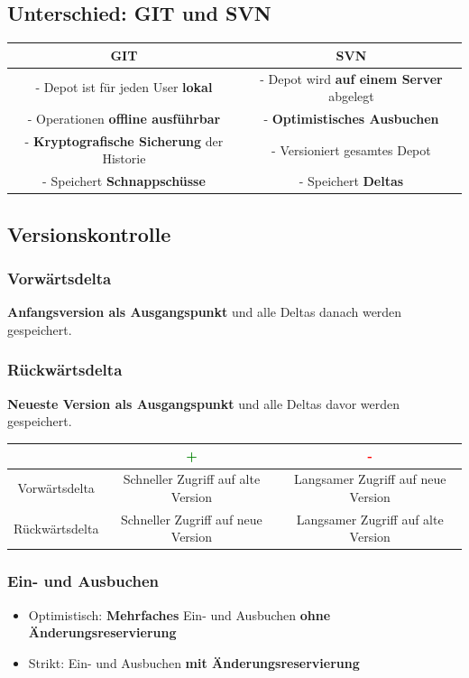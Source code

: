 	\subsection{Unterschied: GIT und SVN}
		
		\begin{center}
			\begin{tabular}{c|c}
				\textbf{GIT}                                      & \textbf{SVN} \\
				\hline
				- Depot ist für jeden User \textbf{lokal}         & - Depot wird \textbf{auf einem Server} abgelegt \\
				- Operationen \textbf{offline ausführbar}         & - \textbf{Optimistisches Ausbuchen} \\
				- \textbf{Kryptografische Sicherung} der Historie & - Versioniert gesamtes Depot \\
				- Speichert \textbf{Schnappschüsse}               & - Speichert \textbf{Deltas} \\
			\end{tabular}
		\end{center}
		
	\subsection{Versionskontrolle}
		
		\subsubsection{Vorwärtsdelta}
		
			\textbf{Anfangsversion als Ausgangspunkt} und alle Deltas danach werden gespeichert.
			
		\subsubsection{Rückwärtsdelta}
			
			\textbf{Neueste Version als Ausgangspunkt} und alle Deltas davor werden gespeichert.
				
			\begin{tabular}{c|c|c}
				               & \textcolor{green}{\textbf{+}}      & \textcolor{red}{\textbf{-}} \\
				\hline
				Vorwärtsdelta  & Schneller Zugriff auf alte Version & Langsamer Zugriff auf neue Version \\
				\hline
				Rückwärtsdelta & Schneller Zugriff auf neue Version & Langsamer Zugriff auf alte Version \\
			\end{tabular}
			
		\subsubsection{Ein- und Ausbuchen}
		
			\begin{itemize}
				\item Optimistisch: \textbf{Mehrfaches} Ein- und Ausbuchen \textbf{ohne Änderungsreservierung}
				\item Strikt: Ein- und Ausbuchen \textbf{mit Änderungsreservierung}
			\end{itemize}